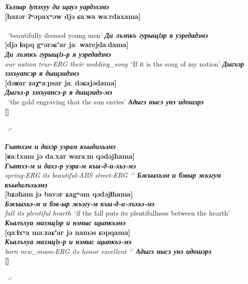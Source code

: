 \documentclass[a4paper,12pt]{book}
\newcommand{\1}[1]{\textbf{\emph{#1}}} %
\newcommand{\2}[1]{\textbf{[#1]}} %
\newcommand{\3}[1]{\fontsize{11pt}{0cm}\textbf{\emph{#1}}} %
\newcommand{\4}[1]{\fontsize{10pt}{0cm}\emph{#1}}	%
\newcommand{\5}[1]{\textbf{/#1/}} %
\newcommand{\6}[1]{\textbf{[#1]}} %
\newcommand{\7}[1]{\fontsize{12pt}{0cm}\emph{#1}} %
\newcommand{\8}[1]{\fontsize{12pt}{0cm}`#1'} %
\newcommand{\9}[1]{\fontsize{12pt}{0cm}(lit. `#1')} %
\begin{document}
\begin{exe}
\ex
\1{Хьэзыр lупэхуу ди щауэ уардэхэмэ}\\
\2{ħazər ʔʷəpaxʷəw djə ɕaːwa waːrdaxama}\\
\3{}\\
\4{}\
\trans \8{beautifully dressed young men}
\ex
\1{Ди лъэпкъ гурыщlэр я уэредадэмэ}\\
\2{djə ɬapq gʷərəɕʼar jaː warejdaːdama}\\
\3{Ди лъэпкъ гурыщlэ-р я уэредадэмэ}\\
\4{our nation true-ERG their wedding\_song}\
\trans \8{If it is the song of my nation}
\ex
\1{Дыгъэр зэхъуапсэр я дыщэидэмэ}\\
\2{dəʁar zaχʷaːpsar jaː dəɕajədama}\\
\3{Дыгъэ-р зэхъуапсэ-р я дыщэидэ-мэ}\\
\4{}\
\trans \8{the gold engraving that the sun envies}
\ex
\1{Адыгэ нысэ унэ идошэрэ}\\
\2{}\\
\3{}\\
\4{}\
\trans \8{}

\end{exe}

\begin{exe}
\ex
\1{Гъатхэм и дахэр уэрам къыдихьэмэ}\\
\2{ʁaːtxam jə daːxar waraːm qədəjħama}\\
\3{Гъатхэ-м и дахэ-р уэра-м къы-д-и-хьэ-мэ}\\
\4{spring-ERG its beautiful-ABS street-ERG}\
\trans \8{}
\ex
\1{Бжьыхьэм и бэвыр жьэгум къыдилъхьэмэ}\\
\2{bʑəħam jə bavər ʑagʷəm qədəjɬħama}\\
\3{Бжьыхьэ-м и бэв-ыр жьэгу-м къы-д-и-лъхьэ-мэ}\\
\4{fall its plentiful hearth}\
\trans \8{if the fall puts its plentifullness between the hearth}
\ex
\1{Къалъхуа мазэщlэр и нэмыс щыпкъэмэ}\\
\2{qaːɬxʷa maːzaɕʼar jə naməs ɕəpqama}\\
\3{Къалъхуа мазэщlэ-р и нэмыс щыпкъэ-мэ}\\
\4{born new_moon-ERG its honor excellent}\
\trans \8{}
\ex
\1{Адыгэ нысэ унэ идошэрэ}\\
\2{}\\
\3{}\\
\4{}\
\trans \8{}

\end{exe}
\end{document}
